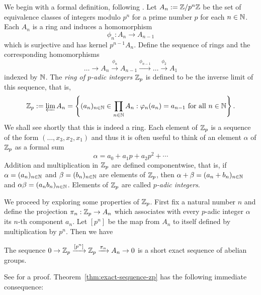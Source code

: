 We begin with a formal definition, following \cite{serre2012course}. Let \(A_n
:= \mathbb{Z}/p^n \mathbb{Z}\) be the set of equivalence classes of integers
modulo \(p^n\) for a prime number \(p\) for each \(n \in \mathbb{N}\). Each
\(A_n\) is a ring and induces a homomorphism\label{sec:padic-def}
\[
  \phi_n : A_{n} \to A_{n - 1}  
\]
which is surjective and has kernel \(p^{n-1}A_n\). Define the sequence of rings
and the corresponding homomorphisms
\begin{equation*}
    \dots \to A_n \xrightarrow{\phi_n} A_{n - 1} \xrightarrow{\phi_{n - 1}} \dots \xrightarrow{\phi_2} A_1
\end{equation*}
indexed by \(\mathbb{N}\). The \emph{ring of \(p\)-adic integers} \(\mathbb{Z}_p\)
is defined to be the inverse limit of this sequence, that is,
\[
  \mathbb{Z}_p := \varprojlim A_n = \left\{
    (a_n)_{n \in \mathbb{N}} \in \prod_{n \in \mathbb{N}} A_n : \varphi_n(a_n) = a_{n - 1} \text{ for all } n \in \mathbb{N}
  \right\}.
\]
We shall see shortly that this is indeed a ring. Each element of \(\mathbb{Z}_p\)
is a sequence of the form \((\dots, x_3, x_2, x_1)\) and thus it is often useful
to think of an element \(\alpha\) of \(\mathbb{Z}_p\) as a formal sum
\[
  \alpha = a_0 + a_1p + a_2p^2 + \cdots
\]
Addition and multiplication in \(\mathbb{Z}_p\) are defined componentwise, that
is, if \(\alpha = (a_n)_{n \in \mathbb{N}}\) and \(\beta = (b_n)_{n \in
\mathbb{N}}\) are elements of \(\mathbb{Z}_p\), then \(\alpha + \beta = (a_n +
b_n)_{n \in \mathbb{N}}\) and \(\alpha\beta = (a_nb_n)_{n \in \mathbb{N}}\).
Elements of \(\mathbb{Z}_p\) are called \emph{\(p\)-adic integers}.

We proceed by exploring some properties of \(\mathbb{Z}_p\). First fix a natural
number \(n\) and define the projection \(\pi_n: \mathbb{Z}_p \to A_n\) which
associates with every \(p\)-adic integer \(\alpha\) its \(n\)-th component
\(a_n\). Let \([p^n]\) be the map from \(A_n\) to itself defined by
multiplication by \(p^n\). Then we have
\begin{theoremx}\label{thm:exact-sequence-zp} The sequence \(0 \to \mathbb{Z}_p
    \xrightarrow{[p^n]} \mathbb{Z}_p \xrightarrow{\pi_n} A_n \to 0\) is a short
    exact sequence of abelian groups.
\end{theoremx}

See \cite[pp.~11--12]{serre2012course} for a proof.
Theorem~\ref{thm:exact-sequence-zp} has the following immediate consequence:

